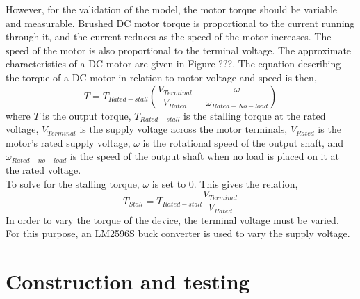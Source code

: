 However, for the validation of the model, the motor torque should be variable and measurable. Brushed DC motor torque is proportional to the current running through it, and the current reduces as the speed of the motor increases. The speed of the motor is also proportional to the terminal voltage. The approximate characteristics of a DC motor are given in Figure ???. The equation describing the torque of a DC motor in relation to motor voltage and speed is then,
\begin{equation}
	T = T_{Rated-stall}(\frac{V_{Terminal}}{V_{Rated}}-\frac{\omega}{\omega_{Rated-No-load}})
\end{equation}
where $T$ is the output torque, $T_{Rated-stall}$ is the stalling torque at the rated voltage, $V_{Terminal}$ is the supply voltage across the motor terminals, $V_{Rated}$ is the motor's rated supply voltage, $\omega$ is the rotational speed of the output shaft, and $\omega_{Rated-no-load}$ is the speed of the output shaft when no load is placed on it at the rated voltage.\\

To solve for the stalling torque, $\omega$ is set to $0$. This gives the relation,
\begin{equation}
	T_{Stall} = T_{Rated-stall}\frac{V_{Terminal}}{V_{Rated}}
\end{equation}
In order to vary the torque of the device, the terminal voltage must be varied. For this purpose, an LM2596S buck converter is used to vary the supply voltage.

\section{Construction and testing}

